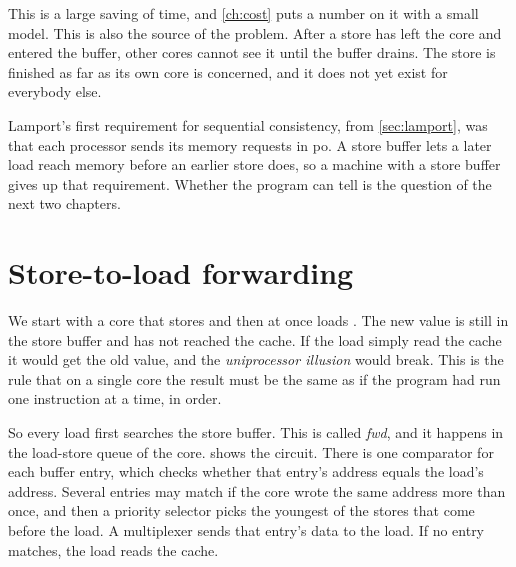 This is a large saving of time, and \cref{ch:cost} puts a number on it with a small model. This is also the source of the problem. After a store has left the core and entered the buffer, other cores cannot see it until the buffer drains. The store is finished as far as its own core is concerned, and it does not yet exist for everybody else.

Lamport's first requirement for sequential consistency, from \cref{sec:lamport}, was that each processor sends its memory requests in \gls{po}\cite{lamport1979how}. A store buffer lets a later load reach memory before an earlier store does, so a machine with a store buffer gives up that requirement. Whether the program can tell is the question of the next two chapters.

\section{Store-to-load forwarding}
\label{sec:forwarding}

We start with a core that stores  and then at once loads . The new value is still in the store buffer and has not reached the cache. If the load simply read the cache it would get the old value, and the \emph{uniprocessor illusion} would break. This is the rule that on a single core the result must be the same as if the program had run one instruction at a time, in order.

So every load first searches the store buffer. This is called \emph{\gls{fwd}}, and it happens in the load-store queue of the core.  shows the circuit. There is one comparator for each buffer entry, which checks whether that entry's address equals the load's address. Several entries may match if the core wrote the same address more than once, and then a priority selector picks the youngest of the stores that come before the load. A multiplexer sends that entry's data to the load. If no entry matches, the load reads the cache.

